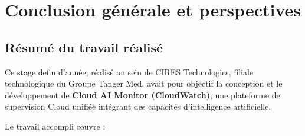 \documentclass[11pt,a4paper]{report}
\begin{document}

\chapter*{Conclusion générale et perspectives}

\section*{Résumé du travail réalisé}

Ce stage defin d'année, réalisé au sein de CIRES Technologies, filiale
technologique du Groupe Tanger Med, avait pour objectif la conception et le
développement de \textbf{Cloud AI Monitor (CloudWatch)}, une plateforme de
supervision Cloud unifiée intégrant des capacités d'intelligence
artificielle.

Le travail accompli couvre :
\end{document}
